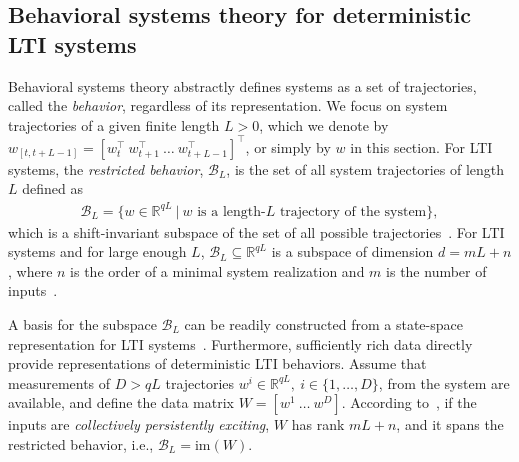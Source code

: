 \documentclass[letterpaper, 10 pt, conference]{ieeeconf}
\def\Wd{W}
\begin{document}
\subsection{Behavioral systems theory for deterministic \gls{LTI} systems} \label{sec:BST}
Behavioral systems theory abstractly defines systems as a set of trajectories, called the \textit{behavior}, regardless of its representation.
We focus on system trajectories of a given finite length $L>0$, which we denote by $w_{[t,t+L-1]}=[w_t^\top~w_{t+1}^\top~\dots~w_{t+L-1}^\top]^\top$, or simply by $w$ in this section.
For \gls{LTI} systems, the \textit{restricted behavior}, $\mathcal{B}_L$, is the set of all system trajectories of length $L$ defined as
\begin{align*}
    \mathcal{B}_L = \{w\in \mathbb{R}^{qL}~|~w \text{ is a length-$L$ trajectory of the system}\},
\end{align*}
which is a shift-invariant subspace of the set of all possible trajectories~\cite{markovsky2022data}.
For \gls{LTI} systems and for large enough $L$, $\mathcal{B}_L \subseteq \mathbb{R}^{qL}$ is a subspace of dimension $d=mL + n$, where $n$ is the order of a minimal system realization and $m$ is the number of inputs~\cite{willems1997introduction}.

A basis for the subspace $\mathcal{B}_L$ can be readily constructed from a state-space representation for \gls{LTI} systems~\cite{markovsky2022data}.
Furthermore, sufficiently rich data directly provide representations of deterministic \gls{LTI} behaviors.
Assume that measurements of $D>qL$ trajectories $w^i\in\mathbb{R}^{qL},~i\in\{1,\dots,D\}$, from the system are available, and define the data matrix $\Wd = [w^1~\dots~w^D]$. 
According to~\cite{van2020willems}, if the inputs are \textit{collectively persistently exciting}, $\Wd$ has rank $mL+n$, and it spans the restricted behavior, i.e., $   \mathcal{B}_L = \mathrm{im}(\Wd)$.
\end{document}
